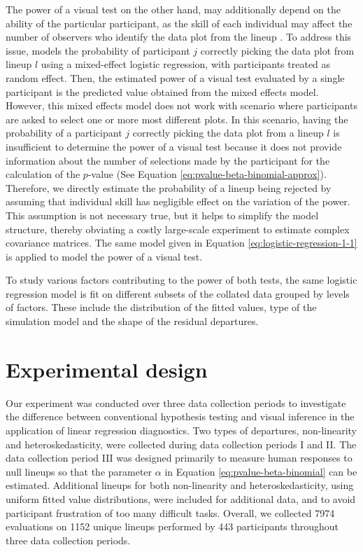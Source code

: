 \documentclass[]{interact}
\theoremstyle{plain}%
\theoremstyle{definition}
\theoremstyle{remark}
\begin{document}
The power of a visual test on the other hand, may additionally depend on
the ability of the particular participant, as the skill of each
individual may affect the number of observers who identify the data plot
from the lineup \citep{majumder_validation_2013}. To address this issue,
\citet{majumder_validation_2013} models the probability of participant
\(j\) correctly picking the data plot from lineup \(l\) using a
mixed-effect logistic regression, with participants treated as random
effect. Then, the estimated power of a visual test evaluated by a single
participant is the predicted value obtained from the mixed effects
model. However, this mixed effects model does not work with scenario
where participants are asked to select one or more most different plots.
In this scenario, having the probability of a participant \(j\)
correctly picking the data plot from a lineup \(l\) is insufficient to
determine the power of a visual test because it does not provide
information about the number of selections made by the participant for
the calculation of the \(p\)-value (See Equation
\ref{eq:pvalue-beta-binomial-approx}). Therefore, we directly estimate
the probability of a lineup being rejected by assuming that individual
skill has negligible effect on the variation of the power. This
assumption is not necessary true, but it helps to simplify the model
structure, thereby obviating a costly large-scale experiment to estimate
complex covariance matrices. The same model given in Equation
\ref{eq:logistic-regression-1-1} is applied to model the power of a
visual test.

To study various factors contributing to the power of both tests, the
same logistic regression model is fit on different subsets of the
collated data grouped by levels of factors. These include the
distribution of the fitted values, type of the simulation model and the
shape of the residual departures.

\hypertarget{experimental-design}{%
\section{Experimental design}\label{experimental-design}}

Our experiment was conducted over three data collection periods to
investigate the difference between conventional hypothesis testing and
visual inference in the application of linear regression diagnostics.
Two types of departures, non-linearity and heteroskedasticity, were
collected during data collection periods I and II. The data collection
period III was designed primarily to measure human responses to null
lineups so that the parameter \(\alpha\) in Equation
\ref{eq:pvalue-beta-binomial} can be estimated. Additional lineups for
both non-linearity and heteroskedasticity, using uniform fitted value
distributions, were included for additional data, and to avoid
participant frustration of too many difficult tasks. Overall, we
collected 7974 evaluations on 1152 unique lineups performed by 443
participants throughout three data collection periods.
\end{document}
